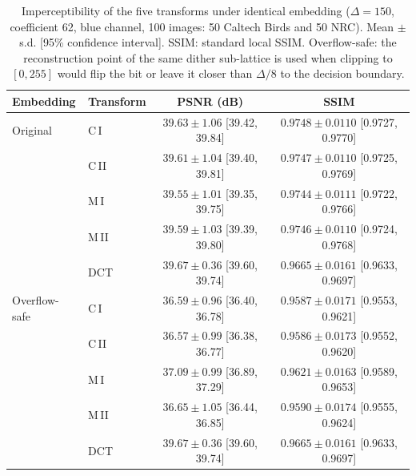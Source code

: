\begin{table}[t]
\centering
\caption{Imperceptibility of the five transforms under identical embedding ($\Delta=150$, coefficient 62, blue channel, 100 images: 50 Caltech Birds and 50 NRC). Mean $\pm$ s.d. [95\% confidence interval]. SSIM: standard local SSIM. Overflow-safe: the reconstruction point of the same dither sub-lattice is used when clipping to $[0,255]$ would flip the bit or leave it closer than $\Delta/8$ to the decision boundary.}
\label{tab:ablation_imperceptibility}
\footnotesize
\setlength{\tabcolsep}{4pt}
\begin{tabular}{llcc}
\toprule
Embedding & Transform & PSNR (dB) & SSIM \\
\midrule
Original & C\,I & $39.63 \pm 1.06$ [39.42, 39.84] & $0.9748 \pm 0.0110$ [0.9727, 0.9770] \\
 & C\,II & $39.61 \pm 1.04$ [39.40, 39.81] & $0.9747 \pm 0.0110$ [0.9725, 0.9769] \\
 & M\,I & $39.55 \pm 1.01$ [39.35, 39.75] & $0.9744 \pm 0.0111$ [0.9722, 0.9766] \\
 & M\,II & $39.59 \pm 1.03$ [39.39, 39.80] & $0.9746 \pm 0.0110$ [0.9724, 0.9768] \\
 & DCT & $39.67 \pm 0.36$ [39.60, 39.74] & $0.9665 \pm 0.0161$ [0.9633, 0.9697] \\
\midrule
Overflow-safe & C\,I & $36.59 \pm 0.96$ [36.40, 36.78] & $0.9587 \pm 0.0171$ [0.9553, 0.9621] \\
 & C\,II & $36.57 \pm 0.99$ [36.38, 36.77] & $0.9586 \pm 0.0173$ [0.9552, 0.9620] \\
 & M\,I & $37.09 \pm 0.99$ [36.89, 37.29] & $0.9621 \pm 0.0163$ [0.9589, 0.9653] \\
 & M\,II & $36.65 \pm 1.05$ [36.44, 36.85] & $0.9590 \pm 0.0174$ [0.9555, 0.9624] \\
 & DCT & $39.67 \pm 0.36$ [39.60, 39.74] & $0.9665 \pm 0.0161$ [0.9633, 0.9697] \\
\bottomrule
\end{tabular}
\end{table}
